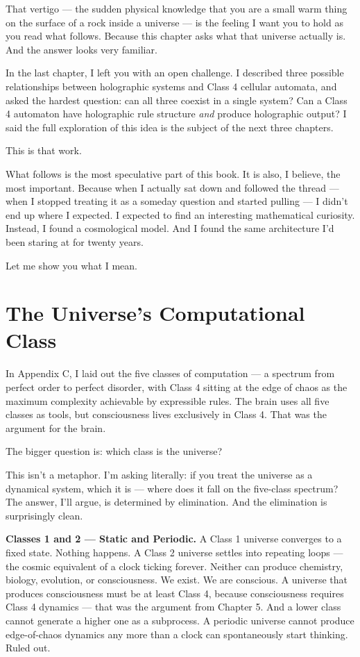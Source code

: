 \documentclass[11pt, twoside, openright]{book}
\begin{document}
That vertigo --- the sudden physical knowledge that you are a small warm thing on the surface of a rock inside a universe --- is the feeling I want you to hold as you read what follows. Because this chapter asks what that universe actually is. And the answer looks very familiar.


In the last chapter, I left you with an open challenge. I described three possible relationships between holographic systems and Class 4 cellular automata, and asked the hardest question: can all three coexist in a single system? Can a Class 4 automaton have holographic rule structure \textit{and} produce holographic output? I said the full exploration of this idea is the subject of the next three chapters.

This is that work.

What follows is the most speculative part of this book. It is also, I believe, the most important. Because when I actually sat down and followed the thread --- when I stopped treating it as a someday question and started pulling --- I didn't end up where I expected. I expected to find an interesting mathematical curiosity. Instead, I found a cosmological model. And I found the same architecture I'd been staring at for twenty years.

Let me show you what I mean.


\section*{The Universe's Computational Class}

In Appendix C, I laid out the five classes of computation --- a spectrum from perfect order to perfect disorder, with Class 4 sitting at the edge of chaos as the maximum complexity achievable by expressible rules. The brain uses all five classes as tools, but consciousness lives exclusively in Class 4. That was the argument for the brain.

The bigger question is: which class is the universe?

This isn't a metaphor. I'm asking literally: if you treat the universe as a dynamical system, which it is --- where does it fall on the five-class spectrum? The answer, I'll argue, is determined by elimination. And the elimination is surprisingly clean.

\textbf{Classes 1 and 2 --- Static and Periodic.} A Class 1 universe converges to a fixed state. Nothing happens. A Class 2 universe settles into repeating loops --- the cosmic equivalent of a clock ticking forever. Neither can produce chemistry, biology, evolution, or consciousness. We exist. We are conscious. A universe that produces consciousness must be at least Class 4, because consciousness requires Class 4 dynamics --- that was the argument from Chapter 5. And a lower class cannot generate a higher one as a subprocess. A periodic universe cannot produce edge-of-chaos dynamics any more than a clock can spontaneously start thinking. Ruled out.
\end{document}
